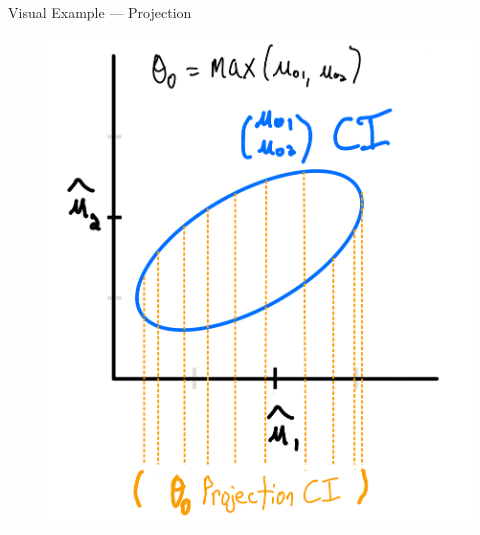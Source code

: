 \documentclass[aspectratio=169, professionalfonts, handout]{beamer}
\begin{document}
\begin{frame}{Visual Example --- Projection}
	\begin{figure}
		\includegraphics[width=.5\textwidth]{figures/sketch-projection}
	\end{figure}
\end{frame}
\end{document}
